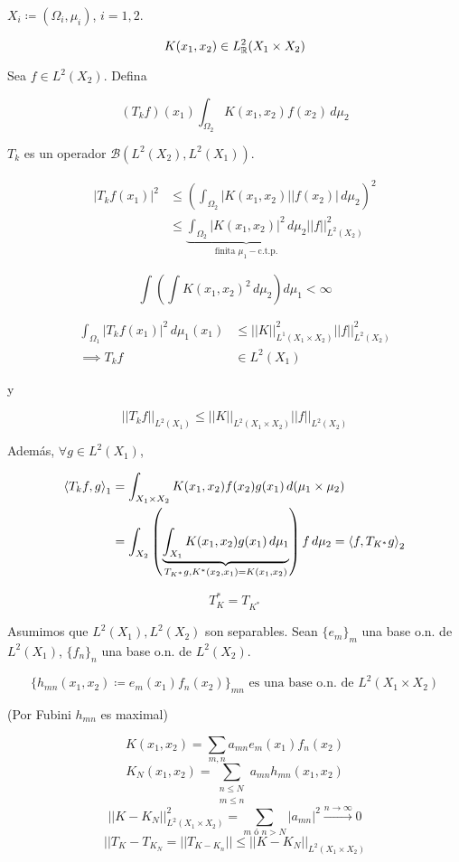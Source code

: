 \begin{fexample}
    $X_i\coloneqq(\Omega_i,\mu_i)$, $i=1,2$.

    \[K(x_1,x_2)\in L^2_{\mathbb{R}}(X_1\times X_2)\]

    Sea $f\in L^2(X_2)$. Defina

    \[(T_k f)(x_1)\int_{\Omega_2}K(x_1,x_2)f(x_2)\,d\mu_2\]

    $T_k$ es un operador $\mathcal{B}(L^2(X_2),L^2(X_1))$.

    \begin{align*}
        |T_k f(x_1)|^2&\leq \left(\int_{\Omega_2}|K(x_1,x_2)||f(x_2)|\,d\mu_2\right)^2\\
        &\leq \underbrace{\int_{\Omega_2} |K(x_1,x_2)|^2\,d\mu_2}_{\text{finita } \mu_1-\text{c.t.p.}} ||f||_{L^2(X_2)}^2
    \end{align*}

    \[\int\left(\int K(x_1,x_2)^2\,d\mu_2\right)d\mu_1<\infty\]

    \begin{align*}
        \int_{\Omega_1}|T_k f(x_1)|^2\,d\mu_1(x_1)&\leq ||K||_{L^1(X_1\times X_2)}^2||f||_{L^2(X_2)}^2\\
        \implies T_k f&\in L^2(X_1)
    \end{align*}

    y 

    \[||T_k f||_{L^2(X_1)}\leq ||K||_{L^2(X_1\times X_2)}||f||_{L^2(X_2)}\]

    Además, $\forall g\in L^2(X_1)$, 

    \begin{align*}
        \left\langle T_k f,g\right\rangle_1&=\int_{X_1\times X_2} K(x_1,x_2)f(x_2)g(x_1)\,d(\mu_1\times \mu_2)\\
        &=\int_{X_2}\left(\underbrace{\int_{X_1}K(x_1,x_2)g(x_1)\,d\mu_1}_{T_{K^*}g, K^*(x_2,x_1)=K(x_1,x_2)}\right) f\,d\mu_2=\left\langle f,T_{K^*}g\right\rangle_2
    \end{align*}

    \[T_K^*=T_{K^*}\]

    Asumimos que $L^2(X_1), L^2(X_2)$ son separables. Sean $\{e_m\}_m$ una base o.n. de $L^2(X_1)$, $\{f_n\}_n$ una base o.n. de $L^2(X_2)$. 

    \[\{h_{mn}(x_1,x_2)\coloneqq e_m(x_1)f_n(x_2)\}_{mn}\text{ es una base o.n. de }L^2(X_1\times X_2)\]

    (Por Fubini $h_{mn}$ es maximal)

    \[K(x_1,x_2)=\sum_{m,n}a_{mn}e_m(x_1)f_n(x_2)\]
    \[K_N(x_1,x_2)=\sum_{\substack{n\leq N\\m\leq n}}a_{mn}h_{mn}(x_1,x_2)\]
    \[||K-K_N||_{L^2(X_1\times X_2)}^2=\sum_{m\text{ ó }n>N} |a_{mn}|^2\xrightarrow{n\to\infty} 0\]
    \[||T_K-T_{K_N}=||T_{K-K_n}||\leq ||K-K_N||_{L^2(X_1\times X_2)}\]


\end{fexample}
